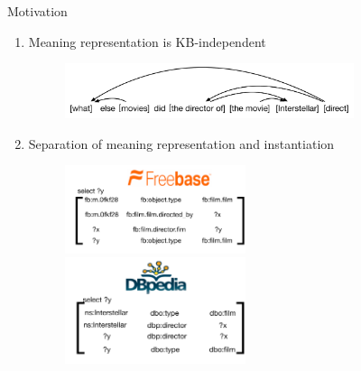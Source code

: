 \documentclass{beamer}
\begin{document}
\begin{frame}{Motivation}
\begin{enumerate}
	\item Meaning representation is KB-independent
	\begin{figure}
	\centering\includegraphics[width=0.8\textwidth]{introduction/motivation_DAG.pdf}
	\end{figure}
	\pause
	\item Separation of meaning representation and instantiation
	\begin{figure}
	\centering\includegraphics[width=0.5\textwidth]{introduction/instantiation_againstFreebase.pdf} 
	\centering\includegraphics[width=0.5\textwidth]{introduction/instantiation_againstDBPedia.pdf} 
	\end{figure}
\end{enumerate}
\end{frame}
\end{document}
